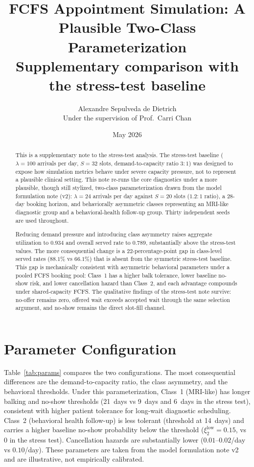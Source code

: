 \documentclass[11pt]{article}
\title{FCFS Appointment Simulation: A Plausible Two-Class Parameterization\\[0.4em]
\large Supplementary comparison with the stress-test baseline}
\author{Alexandre Sepulveda de Dietrich\\[0.3em]
\small Under the supervision of Prof.\ Carri Chan}
\date{May 2026}
\begin{document}
\maketitle

\begin{abstract}
\noindent
This is a supplementary note to the stress-test analysis. The stress-test
baseline ($\lambda=100$ arrivals per day, $S=32$ slots, demand-to-capacity
ratio $3{:}1$) was designed to expose how simulation metrics behave under
severe capacity pressure, not to represent a plausible clinical setting.
This note re-runs the core diagnostics under a more plausible, though still
stylized, two-class parameterization drawn from the model formulation note
(v2): $\lambda=24$ arrivals per day against $S=20$ slots ($1.2{:}1$ ratio),
a $28$-day booking horizon, and behaviorally asymmetric classes representing
an MRI-like diagnostic group and a behavioral-health follow-up group.
Thirty independent seeds are used throughout.

Reducing demand pressure and introducing class asymmetry raises aggregate
utilization to $0.934$ and overall served rate to $0.789$, substantially
above the stress-test values. The more consequential change is a
$22$-percentage-point gap in class-level served rates ($88.1\%$ vs $66.1\%$)
that is absent from the symmetric stress-test baseline. This gap is
mechanically consistent with asymmetric behavioral parameters under a pooled
FCFS booking pool: Class~1 has a higher balk tolerance, lower baseline
no-show risk, and lower cancellation hazard than Class~2, and each advantage
compounds under shared-capacity FCFS. The qualitative findings of the
stress-test note survive: no-offer remains zero, offered wait exceeds
accepted wait through the same selection argument, and no-show remains the
direct slot-fill channel.
\end{abstract}

\section{Parameter Configuration}

Table~\ref{tab:params} compares the two configurations.
The most consequential differences are the demand-to-capacity ratio,
the class asymmetry, and the behavioral thresholds. Under this parameterization,
Class~1 (MRI-like) has longer balking and no-show thresholds (21~days vs
9~days and 6~days in the stress test), consistent with higher patient tolerance
for long-wait diagnostic scheduling. Class~2 (behavioral health follow-up) is
less tolerant (threshold at 14~days) and carries a higher baseline no-show
probability below the threshold ($\xi^{\text{low}}_2 = 0.15$, vs $0$ in the
stress test). Cancellation hazards are substantially lower
($0.01$--$0.02$/day vs $0.10$/day). These parameters are taken from the model
formulation note v2 and are illustrative, not empirically calibrated.
\end{document}
